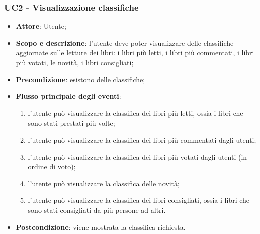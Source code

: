 \subsubsection{UC2 - Visualizzazione classifiche}
\begin{itemize}
	\item \textbf{Attore}: Utente;
	\item \textbf{Scopo e descrizione}: l'utente deve poter visualizzare delle classifiche aggiornate sulle letture dei libri: i libri più letti, i libri più commentati, i libri più votati, le novità, i libri consigliati;
	\item \textbf{Precondizione}: esistono delle classifiche;
	\item \textbf{Flusso principale degli eventi}:
	\begin{enumerate}
		\item l'utente può visualizzare la classifica dei libri più letti, ossia i libri che sono stati prestati più volte;
		\item l'utente può visualizzare la classifica dei libri più commentati dagli utenti;
		\item l'utente può visualizzare la classifica dei libri più votati dagli utenti (in ordine di voto);
		\item l'utente può visualizzare la classifica delle novità;
		\item l'utente può visualizzare la classifica dei libri consigliati, ossia i libri che sono stati consigliati da più persone ad altri.
	\end{enumerate} 
	\item \textbf{Postcondizione}: viene mostrata la classifica richiesta.
\end{itemize}

